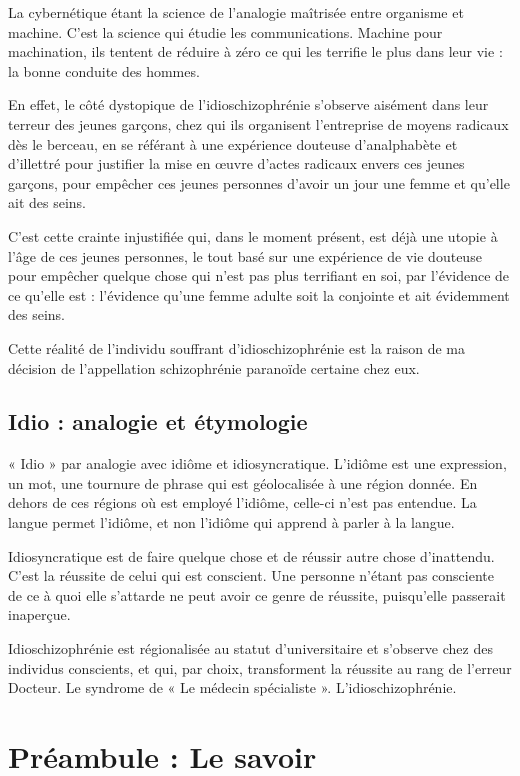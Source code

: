 \documentclass[12pt,oneside]{article}
\begin{document}
La cybernétique étant la science de l'analogie maîtrisée entre organisme et machine. C'est la science qui étudie les communications. Machine pour machination, ils tentent de réduire à zéro ce qui les terrifie le plus dans leur vie : la bonne conduite des hommes.

En effet, le côté dystopique de l'idioschizophrénie s'observe aisément dans leur terreur des jeunes garçons, chez qui ils organisent l'entreprise de moyens radicaux dès le berceau, en se référant à une expérience douteuse d'analphabète et d'illettré pour justifier la mise en œuvre d'actes radicaux envers ces jeunes garçons, pour empêcher ces jeunes personnes d'avoir un jour une femme et qu'elle ait des seins.

C'est cette crainte injustifiée qui, dans le moment présent, est déjà une utopie à l'âge de ces jeunes personnes, le tout basé sur une expérience de vie douteuse pour empêcher quelque chose qui n'est pas plus terrifiant en soi, par l'évidence de ce qu'elle est : l'évidence qu'une femme adulte soit la conjointe et ait évidemment des seins.

Cette réalité de l'individu souffrant d'idioschizophrénie est la raison de ma décision de l'appellation schizophrénie paranoïde certaine chez eux.

\subsection*{Idio : analogie et étymologie}

« Idio » par analogie avec idiôme et idiosyncratique. L'idiôme est une expression, un mot, une tournure de phrase qui est géolocalisée à une région donnée. En dehors de ces régions où est employé l'idiôme, celle-ci n'est pas entendue. La langue permet l'idiôme, et non l'idiôme qui apprend à parler à la langue.

Idiosyncratique est de faire quelque chose et de réussir autre chose d'inattendu. C'est la réussite de celui qui est conscient. Une personne n'étant pas consciente de ce à quoi elle s'attarde ne peut avoir ce genre de réussite, puisqu'elle passerait inaperçue.

Idioschizophrénie est régionalisée au statut d'universitaire et s'observe chez des individus conscients, et qui, par choix, transforment la réussite au rang de l'erreur Docteur. Le syndrome de « Le médecin spécialiste ». L'idioschizophrénie.

\section{Préambule : Le savoir}
\end{document}
